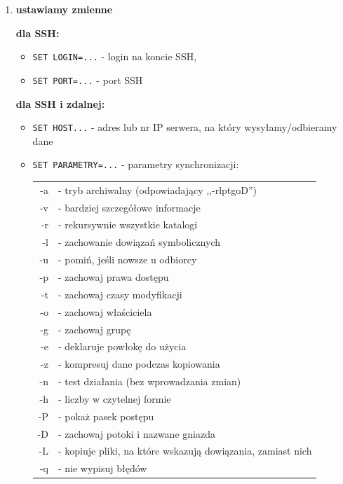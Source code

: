 \begin{enumerate}
(dla wysyłania) 

\verb|rsync -%PARAMETRY% -e "ssh -l %LOGIN% -p %PORT%" %ZRODLO% %HOST%:%CEL%|

(dla odbierania) 

\verb|rsync -%PARAMETRY% -e "ssh -l %LOGIN% -p %PORT%" %HOST%:%ZRODLO% %CEL%|

\item \textbf{ustawiamy zmienne}

\textbf{dla SSH:}
\begin{itemize}
\item \verb|SET LOGIN=...| - login na koncie SSH,
\item \verb|SET PORT=...| - port SSH
\end{itemize}

\textbf{dla SSH i zdalnej:}
\begin{itemize}
\item \verb|SET HOST...| - adres lub nr IP serwera, na który wysyłamy/odbieramy dane
\item \verb|SET PARAMETRY=...| - parametry synchronizacji:
\begin{center}
\begin{tabular}{ r l }
-a & - tryb archiwalny (odpowiadający ,,-rlptgoD'') \\
-v & - bardziej szczegółowe informacje \\
-r & - rekursywnie wszystkie katalogi \\ 
-l & - zachowanie dowiązań symbolicznych \\
-u & - pomiń, jeśli nowsze u odbiorcy \\
-p & - zachowaj prawa dostępu \\
-t & - zachowaj czasy modyfikacji \\
-o & - zachowaj właściciela \\
-g & - zachowaj grupę \\
-e & - deklaruje powłokę do użycia \\
-z & - kompresuj dane podczas kopiowania \\
-n & - test działania (bez wprowadzania zmian) \\
-h & - liczby w czytelnej formie \\
-P & - pokaż pasek postępu \\
-D & - zachowaj potoki i nazwane gniazda\\
-L & - kopiuje pliki, na które wskazują dowiązania, zamiast nich \\
-q & - nie wypisuj błędów
\end{tabular}

\end{center}
\end{itemize}
\end{enumerate}
